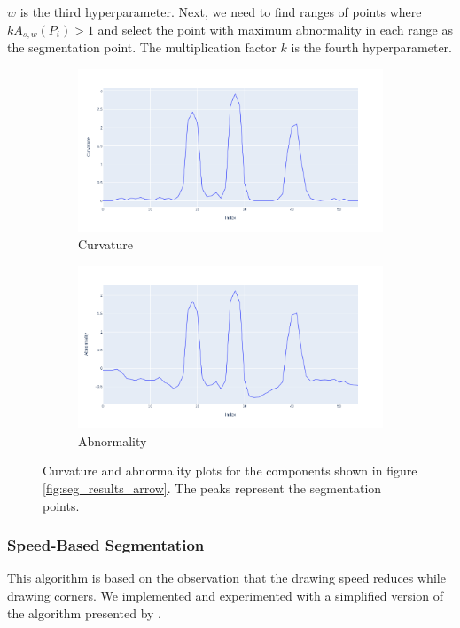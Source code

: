 $w$ is the third hyperparameter. Next, we need to find ranges of points where $k A_{s, w}(P_i) > 1$ and select the point with maximum abnormality in each range as the segmentation point. The multiplication factor $k$ is the fourth hyperparameter.\\

\begin{figure}
	\centering
	\begin{subfigure}{0.45\textwidth}
		\centering
		\includegraphics[scale=0.23]{./img/seg_curvature_arrow}
		\caption{Curvature}
	\end{subfigure}
	\hfill
	\begin{subfigure}{0.45\textwidth}
		\centering
		\includegraphics[scale=0.23]{./img/seg_abnormality_arrow}
		\caption{Abnormality}
	\end{subfigure}
	\caption{Curvature and abnormality plots for the components shown in figure \ref{fig:seg_results_arrow}. The peaks represent the segmentation points.}
	\label{fig:seg_curvature}
\end{figure}

\subsubsection{Speed-Based Segmentation}
This algorithm is based on the observation that the drawing speed reduces while drawing corners. We implemented and experimented with a simplified version of the algorithm presented by \citeauthor{wang2021segmentation} \cite{wang2021segmentation}.\\

